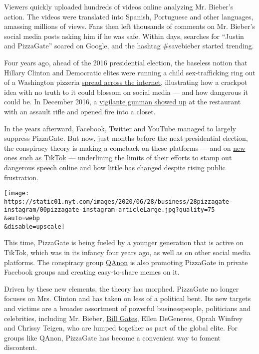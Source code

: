 Viewers quickly uploaded hundreds of videos online analyzing Mr.
Bieber's action. The videos were translated into Spanish, Portuguese and
other languages, amassing millions of views. Fans then left thousands of
comments on Mr. Bieber's social media posts asking him if he was safe.
Within days, searches for ``Justin and PizzaGate'' soared on Google, and
the hashtag \#savebieber started trending.

Four years ago, ahead of the 2016 presidential election, the baseless
notion that Hillary Clinton and Democratic elites were running a child
sex-trafficking ring out of a Washington pizzeria
\href{https://www.nytimes.com/2016/11/21/technology/fact-check-this-pizzeria-is-not-a-child-trafficking-site.html?searchResultPosition=11}{spread
across the internet}, illustrating how a crackpot idea with no truth to
it could blossom on social media --- and how dangerous it could be. In
December 2016, a
\href{https://www.nytimes.com/2016/12/05/business/media/comet-ping-pong-pizza-shooting-fake-news-consequences.html?searchResultPosition=12}{vigilante
gunman showed up} at the restaurant with an assault rifle and opened
fire into a closet.

In the years afterward, Facebook, Twitter and YouTube managed to largely
suppress PizzaGate. But now, just months before the next presidential
election, the conspiracy theory is making a comeback on these platforms
--- and on
\href{https://www.nytimes.com/2020/06/03/technology/tiktok-is-the-future.html}{new
ones such as TikTok} --- underlining the limits of their efforts to
stamp out dangerous speech online and how little has changed despite
rising public frustration.

\texttt{[image: https://static01.nyt.com/images/2020/06/28/business/28pizzagate-instagram/00pizzagate-instagram-articleLarge.jpg?quality=75\\\&auto=webp\\\&disable=upscale]}

This time, PizzaGate is being fueled by a younger generation that is
active on TikTok, which was in its infancy four years ago, as well as on
other social media platforms. The conspiracy group
\href{https://www.nytimes.com/2020/07/14/us/politics/qanon-politicians-candidates.html}{QAnon}
is also promoting PizzaGate in private Facebook groups and creating
easy-to-share memes on it.

Driven by these new elements, the theory has morphed. PizzaGate no
longer focuses on Mrs. Clinton and has taken on less of a political
bent. Its new targets and victims are a broader assortment of powerful
businesspeople, politicians and celebrities, including Mr. Bieber,
\href{https://www.nytimes.com/2020/04/17/technology/bill-gates-virus-conspiracy-theories.html}{Bill
Gates}, Ellen DeGeneres, Oprah Winfrey and Chrissy Teigen, who are
lumped together as part of the global elite. For groups like QAnon,
PizzaGate has become a convenient way to foment discontent.

